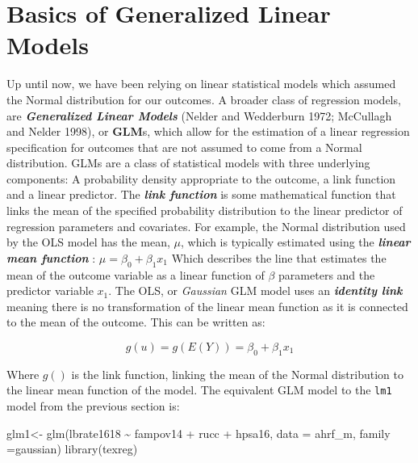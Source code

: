 \documentclass[
  letterpaper,
  DIV=11,
  numbers=noendperiod]{scrreprt}
\newenvironment{Shaded}{\begin{snugshade}}{\end{snugshade}}
\newcommand{\AttributeTok}[1]{\textcolor[rgb]{0.40,0.45,0.13}{#1}}
\newcommand{\FunctionTok}[1]{\textcolor[rgb]{0.28,0.35,0.67}{#1}}
\newcommand{\NormalTok}[1]{\textcolor[rgb]{0.00,0.23,0.31}{#1}}
\newcommand{\OtherTok}[1]{\textcolor[rgb]{0.00,0.23,0.31}{#1}}
\newcommand{\SpecialCharTok}[1]{\textcolor[rgb]{0.37,0.37,0.37}{#1}}
\begin{document}
\hypertarget{basics-of-generalized-linear-models}{%
\section{Basics of Generalized Linear
Models}\label{basics-of-generalized-linear-models}}

Up until now, we have been relying on linear statistical models which
assumed the Normal distribution for our outcomes. A broader class of
regression models, are \textbf{\emph{Generalized Linear Models}} (Nelder
and Wedderburn 1972; McCullagh and Nelder 1998), or \textbf{GLM}s, which
allow for the estimation of a linear regression specification for
outcomes that are not assumed to come from a Normal distribution. GLMs
are a class of statistical models with three underlying components: A
probability density appropriate to the outcome, a link function and a
linear predictor. The \textbf{\emph{link function}} is some mathematical
function that links the mean of the specified probability distribution
to the linear predictor of regression parameters and covariates. For
example, the Normal distribution used by the OLS model has the mean,
\(\mu\), which is typically estimated using the \textbf{\emph{linear
mean function}} : \(\mu = \beta_0 + \beta_1 x_1\) Which describes the
line that estimates the mean of the outcome variable as a linear
function of \(\beta\) parameters and the predictor variable \(x_1\). The
OLS, or \emph{Gaussian} GLM model uses an \textbf{\emph{identity link}}
meaning there is no transformation of the linear mean function as it is
connected to the mean of the outcome. This can be written as:

\[g(u) = g(E(Y)) = \beta_0 + \beta_1 x_1\]

Where \(g()\) is the link function, linking the mean of the Normal
distribution to the linear mean function of the model. The equivalent
GLM model to the \texttt{lm1} model from the previous section is:

\begin{Shaded}
\begin{Highlighting}[]
\NormalTok{glm1}\OtherTok{\textless{}{-}} \FunctionTok{glm}\NormalTok{(lbrate1618 }\SpecialCharTok{\textasciitilde{}}\NormalTok{  fampov14 }\SpecialCharTok{+}\NormalTok{ rucc }\SpecialCharTok{+}\NormalTok{ hpsa16,}
          \AttributeTok{data =}\NormalTok{ ahrf\_m, }
          \AttributeTok{family =}\NormalTok{gaussian)}
\FunctionTok{library}\NormalTok{(texreg)}
\end{Highlighting}
\end{Shaded}
\end{document}
